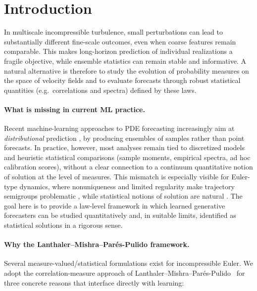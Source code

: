 \documentclass{article}
\numberwithin{equation}{section}
\theoremstyle{plain}
\theoremstyle{definition}
\theoremstyle{remark}
\begin{document}
\section{Introduction}


In multiscale incompressible turbulence, small perturbations can lead to substantially different fine-scale outcomes,
even when coarse features remain comparable. This makes long-horizon prediction of individual realizations a fragile
objective, while ensemble statistics can remain stable and informative. A natural alternative is therefore to study the
evolution of probability measures on the space of velocity fields and to evaluate forecasts through robust statistical
quantities (e.g.\ correlations and spectra) defined by these laws.

\paragraph{What is missing in current ML practice.}
Recent machine-learning approaches to PDE forecasting increasingly aim at \emph{distributional} prediction \cite{price2025probabilistic, bulte2025probabilistic, price2023gencast, larsson2025diffusion, andrae2024continuous, gao2024bayesian, mahesh2024huge}, by producing
ensembles of samples rather than point forecasts. In practice, however, most analyses remain tied to discretized models
and heuristic statistical comparisons (sample moments, empirical spectra, ad hoc calibration scores), without a clear
connection to a continuum quantitative notion of solution at the level of measures.
This mismatch is especially visible for Euler-type dynamics, where nonuniqueness and limited regularity make trajectory
semigroups problematic \cite{majda2002vorticity}, while statistical notions of solution are natural \cite{LMP2021}. The goal here is to provide a law-level
framework in which learned generative forecasters can be studied quantitatively and, in suitable limits, identified as
statistical solutions in a rigorous sense.

\paragraph{Why the Lanthaler--Mishra--Par\'es-Pulido framework.}
Several measure-valued/statistical formulations exist for incompressible Euler. We adopt the correlation-measure approach
of Lanthaler--Mishra--Par\'es-Pulido~\cite{LMP2021} for three concrete reasons that interface directly with learning:
\end{document}
